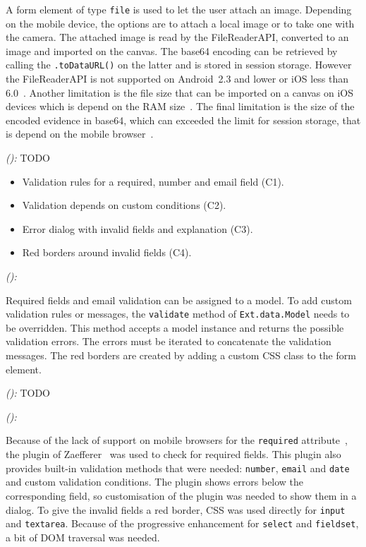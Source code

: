 \documentclass[a4paper]{artikel3}
\newcommand{\code}[1]{\texttt{#1}}
\newcommand{\framework}[2]{ \emph{#1 (\textbf{#2}): }} %
\begin{document}
A form element of type \code{file} is used to let the user attach an image.
Depending on the mobile device, the options are to attach a local image or to take one with the camera.
The attached image is read by the FileReaderAPI, converted to an image and imported on the canvas.
The base64 encoding can be retrieved by calling the \code{.toDataURL()} on the latter and is stored in session storage.
However the FileReaderAPI is not supported on Android~2.3 and lower or iOS less than 6.0~\cite{Deveria2013a}.
Another limitation is the file size that can be imported on a canvas on iOS devices which is depend on the RAM size~\cite{Apple2012}.
The final limitation is the size of the encoded evidence in base64, which can exceeded the limit for session storage, that is depend on the mobile browser~\cite{Gonzalez2012}.

\framework{\lungoa{}}{}
TODO

\begin{itemize}
 \item Validation rules for a required, number and email field (C1).
 \item Validation depends on custom conditions (C2).
 \item Error dialog with invalid fields and explanation (C3).
 \item Red borders around invalid fields (C4).
\end{itemize}

\framework{\sta{}}{}

Required fields and email validation can be assigned to a model.  
To add custom validation rules or messages,  the \code{validate} method of \code{Ext.data.Model} needs to be overridden.  
This method accepts a model instance and returns the possible validation errors.  
The errors must be iterated to concatenate the validation messages.
The red borders are created by adding a custom CSS class to the form element.

\framework{\kendoa{}}{}
TODO

\framework{\jqma{}}{}

Because of the lack of support on mobile browsers for the \code{required} attribute~\cite{Deveria2013}, the plugin of Zaefferer~\cite{Zaefferer2013} was used to check for required fields.
This plugin also provides built-in validation methods that were needed: \code{number}, \code{email} and \code{date} and custom validation conditions.
The plugin shows errors below the corresponding field, so customisation of the plugin was needed to show them in a dialog.
To give the invalid fields a red border, CSS was used directly for \code{input} and \code{textarea}.
Because of the progressive enhancement for \code{select} and \code{fieldset}, a bit of DOM traversal was needed.
\end{document}
